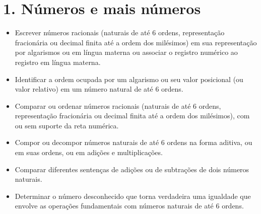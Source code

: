 \chapter{1. Números e mais números}



\begin{itemize}
\item Escrever números racionais (naturais de até 6 ordens, representação
fracionária ou decimal finita até a ordem dos milésimos) em sua
representação por algarismos ou em língua materna ou associar o registro
numérico ao registro em língua materna.

\item Identificar a ordem ocupada por um algarismo ou seu valor posicional
(ou valor relativo) em um número natural de até 6 ordens.

\item Comparar ou ordenar números racionais (naturais de até 6 ordens,
representação fracionária ou decimal finita até a ordem dos milésimos),
com ou sem suporte da reta numérica.

\item Compor ou decompor números naturais de até 6 ordens na forma aditiva,
ou em suas ordens, ou em adições e multiplicações.

\item Comparar diferentes sentenças de adições ou de subtrações de dois números naturais.

\item Determinar o número desconhecido que torna verdadeira uma igualdade
que envolve as operações fundamentais com números naturais de até 6
ordens.
\end{itemize}


